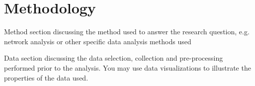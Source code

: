 \section{Methodology}

Method section discussing the method used to answer the research question, e.g. network analysis or other specific data analysis methods used

Data section discussing the data selection, collection and pre-processing performed prior to the analysis. You may use data visualizations to illustrate the properties of the data used.